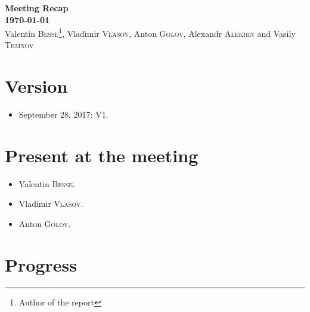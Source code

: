 \documentclass[12pt,a4paper]{article}
\begin{document}
	
	
\begin{center}
	{\bf\Large Meeting Recap~\MakeUppercase{}}\\
	{\bf\Large \today}\\
	\vspace{0.4cm}
	{\large Valentin \textsc{Besse}\footnote{Author of the report}, Vladimir \textsc{Vlasov}, Anton \textsc{Golov}, Alexandr \textsc{Alekhin} and Vasily \textsc{Temnov}}\\
	\vspace{0.6cm}
\end{center}
\vspace{0.1cm}

\section*{Version}

\begin{itemize}
    \item September 28, 2017: V1.
\end{itemize}

\section*{Present at the meeting}

\begin{itemize}
    \item Valentin \textsc{Besse}.
    \item Vladimir \textsc{Vlasov}.
    \item Anton \textsc{Golov}.
\end{itemize}

\section*{Progress}
\end{document}
